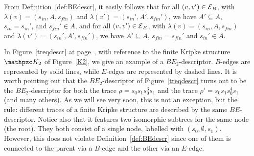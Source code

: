 From Definition~\ref{def:BEdescr}, it easily follows that for all $(v,v')\in \operatorname{\mathcal{E}}_B$, with $\lambda(v)=(s_{in},A,s_{fin})$ and $\lambda(v')=(s_{in}',A',s_{fin}')$, we have $A'\subseteq A$, $s_{in}=s_{in}'$, and $s_{fin}'\in A$, and  for all $(v,v')\in \operatorname{\mathcal{E}}_E$, with $\lambda(v)=(s_{in},A,s_{fin})$ and $\lambda(v')=(s_{in}',A',s_{fin}')$, we have $A'\subseteq A$, $s_{fin}=s_{fin}'$ and $s_{in}'\in A$.

%
\begin{example}
In Figure~\ref{treqdescr} at page~\pageref{treqdescr}, with reference to the finite Kripke structure $\Ku_{2}$ of Figure~\ref{K2}, we give an example of a $BE_2$-descriptor. $B$-edges are represented by solid lines, while $E$-edges are represented by dashed lines. It is worth pointing out that the $BE_2$-descriptor of Figure~\ref{treqdescr} turns out to be the $BE_2$-descriptor for both the trace $\rho=s_0s_1s_0^3s_1$ and the trace $\rho'=s_0s_1s_0^4s_1$ (and many others). As we will see very soon, this is not an exception, but the rule: different traces of a finite Kripke structure are described by the same $BE$-descriptor.
Notice also that it features two isomorphic subtrees for the same node (the root). They both consist of a single node, labelled with $(s_0,\emptyset,s_1)$. However, this does not violate Definition~\ref{def:BEdescr} since one of them is connected to the parent via a $B$-edge and the other via an $E$-edge.
\end{example}

\begin{sidewaysfigure}
\centering
{}
\caption{An example of $BE_2$-descriptor.}\label{treqdescr}
\end{sidewaysfigure}


